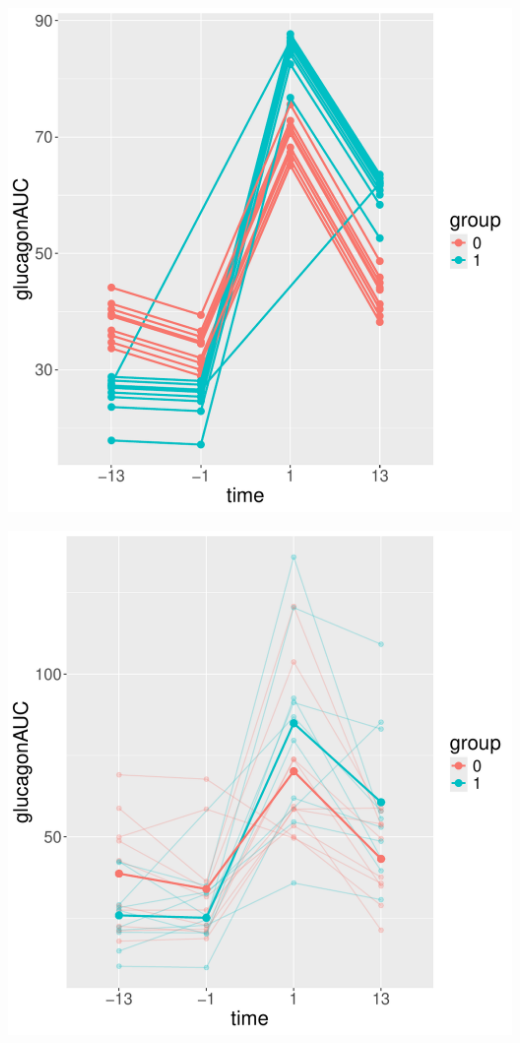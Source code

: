 \documentclass[12pt]{article}
\begin{document}
\begin{minipage}{0.3\linewidth}
\begin{center}
\includegraphics[width=\textwidth]{./figures/fit-baseline-autoplot.pdf}
\end{center}
\end{minipage}
\begin{minipage}{0.3\linewidth}
\begin{center}
\includegraphics[width=\textwidth]{./figures/fitAll-autoplot.pdf}
\end{center}
\end{minipage}
\end{document}
